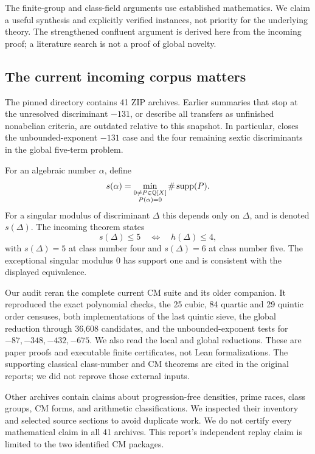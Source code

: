 The finite-group and class-field arguments use established mathematics. We claim a useful synthesis and explicitly verified instances, not priority for the underlying theory. The strengthened confluent argument is derived here from the incoming proof; a literature search is not a proof of global novelty.

\subsection{The current incoming corpus matters}

The pinned directory contains 41 ZIP archives. Earlier summaries that stop at the unresolved discriminant $-131$, or describe all transfers as unfinished nonabelian criteria, are outdated relative to this snapshot. In particular,  closes the unbounded-exponent $-131$ case and the four remaining sextic discriminants in the global five-term problem.\cite{prior_sparse}

For an algebraic number $\alpha$, define
\[
 s(\alpha)=\min_{\substack{0\ne P\in\mathbb Q[X]\\P(\alpha)=0}}
             \#\operatorname{supp}(P).
\]
For a singular modulus of discriminant $\Delta$ this depends only on $\Delta$, and is denoted $s(\Delta)$. The incoming theorem states
\begin{equation}\label{eq:prior-classification}
 s(\Delta)\le5\quad\Longleftrightarrow\quad h(\Delta)\le4,
\end{equation}
with $s(\Delta)=5$ at class number four and $s(\Delta)=6$ at class number five. The exceptional singular modulus $0$ has support one and is consistent with the displayed equivalence.

Our audit reran the complete current CM suite and its older companion. It reproduced the exact polynomial checks, the 25 cubic, 84 quartic and 29 quintic order censuses, both implementations of the last quintic sieve, the global reduction through 36,608 candidates, and the unbounded-exponent tests for $-87,-348,-432,-675$. We also read the local and global reductions. These are paper proofs and executable finite certificates, not Lean formalizations. The supporting classical class-number and CM theorems are cited in the original reports; we did not reprove those external inputs.

Other archives contain claims about progression-free densities, prime races, class groups, CM forms, and arithmetic classifications. We inspected their inventory and selected source sections to avoid duplicate work. We do not certify every mathematical claim in all 41 archives. This report's independent replay claim is limited to the two identified CM packages.

